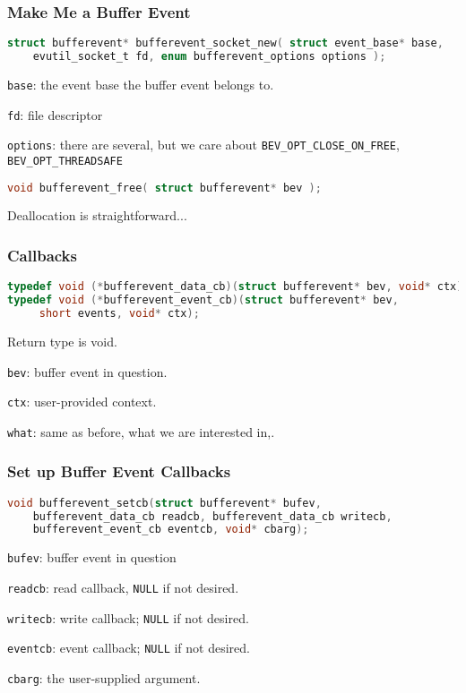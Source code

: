 \begin{frame}[fragile]
	\frametitle{Make Me a Buffer Event}

	\begin{lstlisting}[language=C]
struct bufferevent* bufferevent_socket_new( struct event_base* base, 
    evutil_socket_t fd, enum bufferevent_options options );
\end{lstlisting}

	\texttt{base}: the event base the buffer event belongs to.

	\texttt{fd}: file descriptor

	\texttt{options}: there are several, but we care about \texttt{BEV\_OPT\_CLOSE\_ON\_FREE}, \texttt{BEV\_OPT\_THREADSAFE}


	\begin{lstlisting}[language=C]
void bufferevent_free( struct bufferevent* bev );
\end{lstlisting}

	Deallocation is straightforward...
\end{frame}

\begin{frame}[fragile]
	\frametitle{Callbacks}

	\begin{lstlisting}[language=C]
typedef void (*bufferevent_data_cb)(struct bufferevent* bev, void* ctx);
typedef void (*bufferevent_event_cb)(struct bufferevent* bev, 
     short events, void* ctx);
\end{lstlisting}

	Return type is void.

	\texttt{bev}: buffer event in question.

	\texttt{ctx}: user-provided context.

	\texttt{what}: same as before, what we are interested in,.

\end{frame}


\begin{frame}[fragile]
	\frametitle{Set up Buffer Event Callbacks}

	\begin{lstlisting}[language=C]
void bufferevent_setcb(struct bufferevent* bufev, 
    bufferevent_data_cb readcb, bufferevent_data_cb writecb, 
    bufferevent_event_cb eventcb, void* cbarg);
\end{lstlisting}

	\texttt{bufev}: buffer event in question

	\texttt{readcb}: read callback, \texttt{NULL} if not desired.

	\texttt{writecb}: write callback; \texttt{NULL} if not desired.

	\texttt{eventcb}: event callback; \texttt{NULL} if not desired.

	\texttt{cbarg}: the user-supplied argument.

\end{frame}


